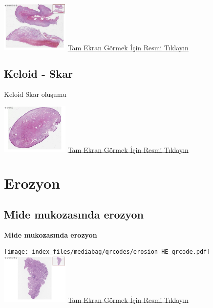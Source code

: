 \documentclass[
  letterpaper,
  DIV=11,
  numbers=noendperiod]{scrreprt}
\begin{document}
\href{https://images.patolojiatlasi.com/fibrosis/HE.html}{\includegraphics[width=0.25\textwidth,height=\textheight]{./screenshots/thumbnail_fibrosis.png}}
\href{https://images.patolojiatlasi.com/fibrosis/HE.html}{Tam Ekran
Görmek İçin Resmi Tıklayın}

\hypertarget{sec-keloid-skar}{%
\section{Keloid - Skar}\label{sec-keloid-skar}}

Keloid Skar oluşumu

\href{https://images.patolojiatlasi.com/keloid-scar/HE.html}{\includegraphics[width=0.25\textwidth,height=\textheight]{./screenshots/thumbnail_keloid-scar.png}}
\href{https://images.patolojiatlasi.com/keloid-scar/HE.html}{Tam Ekran
Görmek İçin Resmi Tıklayın}

\hypertarget{sec-erozyon}{%
\chapter{Erozyon}\label{sec-erozyon}}

\hypertarget{sec-mide-mukozasinda-erozyon}{%
\section{Mide mukozasında erozyon}\label{sec-mide-mukozasinda-erozyon}}

\textbf{Mide mukozasında erozyon}

\texttt{[image: index\_files/mediabag/qrcodes/erosion-HE\_qrcode.pdf]}
\href{https://images.patolojiatlasi.com/erosion/HE.html}{\includegraphics[width=0.25\textwidth,height=\textheight]{./screenshots/thumbnail_erosion.png}}
\href{https://images.patolojiatlasi.com/erosion/HE.html}{Tam Ekran
Görmek İçin Resmi Tıklayın}
\end{document}
